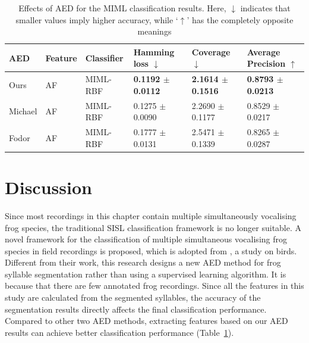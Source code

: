 \begin{table}[htb!]
\centering
\caption[Effects of AED on the MIML classification results]{Effects of AED for the MIML classification results. Here, $\downarrow$ indicates that smaller values imply higher accuracy, while ‘$\uparrow$’ has the completely opposite meanings}
\label{Ch6:AEDCompare}
\begin{tabular}{llllll}
\hline\hline
AED     & Feature & Classifier & Hamming loss $\downarrow$ & Coverage $\downarrow$     & Average Precision  $\uparrow$\\ \hline
Ours    & AF      & MIML-RBF   & \textbf{0.1192 $\pm$ 0.0112} & \textbf{2.1614 $\pm$ 0.1516} & \textbf{0.8793 $\pm$ 0.0213}     \\ 
Michael & AF      & MIML-RBF   & 0.1275 $\pm$ 0.0090 & 2.2690 $\pm$ 0.1177 & 0.8529 $\pm$ 0.0217     \\ 
Fodor   & AF      & MIML-RBF   & 0.1777 $\pm$ 0.0131 & 2.5471 $\pm$ 0.1339 & 0.8265 $\pm$ 0.0287     \\ \hline\hline
\end{tabular}
\end{table}




\section{Discussion}
Since most recordings in this chapter contain multiple simultaneously vocalising frog species, the traditional SISL classification framework is no longer suitable. A novel framework for the classification of multiple simultaneous vocalising frog species in field recordings is proposed, which is adopted from \citep{briggs2012acoustic}, a study on birds. Different from their work, this research designs a new AED method for frog syllable segmentation rather than using a supervised learning algorithm. It is because that there are few annotated frog recordings. Since all the features in this study are calculated from the segmented syllables, the accuracy of the segmentation results directly affects the final classification performance. Compared to other two AED methods, extracting features based on our AED results can achieve better classification performance (Table~\ref{Ch6:AEDCompare}).

